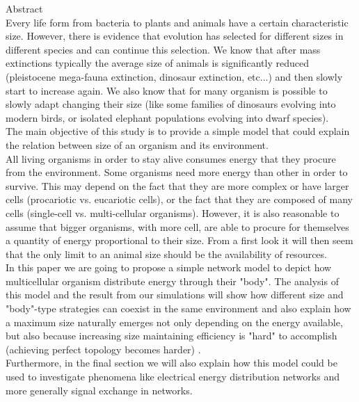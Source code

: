 \documentclass{amsart}
\theoremstyle{plain}
\numberwithin{equation}{section}
\begin{document}
Abstract\\
Every life form from bacteria to plants and animals have a certain characteristic size. However, there is evidence that evolution has selected for different sizes in different species and can continue this selection. We know that after mass extinctions typically the average size of animals is significantly reduced (pleistocene mega-fauna extinction, dinosaur extinction, etc...) and then slowly start to increase again. We also know that for many organism is possible to slowly adapt changing their size (like some families of dinosaurs evolving into modern birds, or isolated elephant populations evolving into dwarf species).
\\
The main objective of this study is to provide a simple model that could explain the relation between size of an organism and its environment.
\\
All living organisms in order to stay alive consumes energy that they procure from the environment. Some organisms need more energy than other in order to survive. This may depend on the fact that they are more complex or have larger cells (procariotic vs. eucariotic cells), or the fact that they are composed of many cells (single-cell vs. multi-cellular organisms). However, it is also reasonable to assume that bigger organisms, with more cell, are able to procure for themselves a quantity of energy proportional to their size. From a first look it will then seem that the only limit to an animal size should be the availability of resources.\\
 In this paper we are going to propose a simple network model to depict how multicellular organism distribute energy through their "body". The analysis of this model and the result from our simulations will show how different size and "body"-type strategies can coexist in the same environment and also explain how a maximum size naturally emerges not only depending on the energy available, but also because increasing size maintaining efficiency is "hard" to accomplish (achieving perfect topology becomes harder) .\\
Furthermore, in the final section we will also explain how this model could be used to investigate phenomena like electrical energy distribution networks and more generally signal exchange in networks.   
\\
\end{document}
